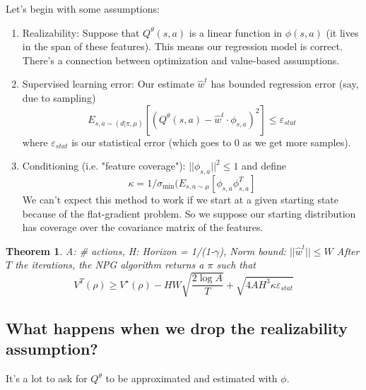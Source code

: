 \documentclass[12pt,reqno]{amsart}
\newtheorem{theorem}{Theorem}[section]
\newcommand{\smcond}[2]{( {#1} \vert {#2})}
\newcommand\eps{\varepsilon}
\begin{document}
Let's begin with some assumptions:
\begin{enumerate}
\item Realizability: Suppose that $Q^\theta(s,a)$ is a linear function in $\phi(s,a)$ (it lives in the span of these features). This means our regression model is correct. There's a connection between optimization and value-based assumptions.\\
\item Supervised learning error: Our estimate $\hat{w}^{t}$ has bounded regression error (say, due to sampling) 
\begin{equation}
E_{s,a\sim \smcond{d}{\pi,\mu}}\left[ (Q^\theta(s,a) - \hat{w}^t \cdot \phi_{s,a})^2 \right] \leq \eps_{stat}
\end{equation}
where $\eps_{stat}$ is our statistical error (which goes to 0 as we get more samples).\\
\item Conditioning (i.e. "feature coverage"): $||\phi_{s,a}||^{2} \leq 1$ and define
\begin{equation}
\kappa = 1/ \sigma_{\min} (E_{s,a\sim \mu} \left[ \phi_{s,a} \phi_{s,a}^{T} \right]
\end{equation}
We can't expect this method to work if we start at a given starting state because of the flat-gradient problem. So we suppose our starting distribution has coverage over the covariance matrix of the features.\\
\end{enumerate}
\break
\begin{shaded}
\begin{theorem}

A: \# actions, H: Horizon = 1/(1-$\gamma$), Norm bound: $||\hat{w}^{t}|| \leq W$
\newline
After $T$ the iterations, the NPG algorithm returns a $\pi$ such that
\begin{equation}
V^{T}(\rho) \geq V^{\star}(\rho) - HW \sqrt{\frac{2 \log A}{T}} + \sqrt{4AH^{3}\kappa\eps_{stat}}
\end{equation}
\end{theorem}
\end{shaded}

\bigskip
\bigskip
\bigskip
\subsection{What happens when we drop the realizability assumption?}
It's a lot to ask for $Q^{\theta}$ to be approximated and estimated with $\phi$.
\end{document}
